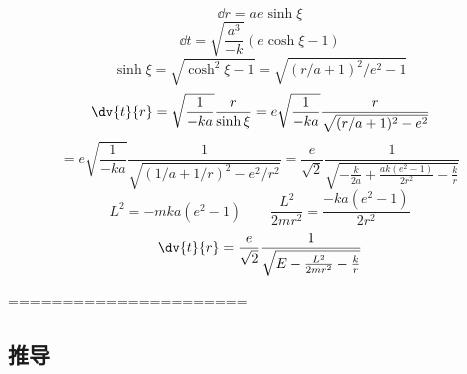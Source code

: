 \begin{equation}
\dd{r} = ae \sinh\xi
\end{equation}
\begin{equation}
\dd{t} = \sqrt{\frac{a^3}{-k}} (e \cosh \xi - 1)
\end{equation}
\begin{equation}
\sinh\xi = \sqrt{\cosh^2\xi - 1} = \sqrt{(r/a + 1)^2/e^2 - 1}
\end{equation}
\begin{equation}
\dv{t}{r} = \sqrt{\frac{1}{-ka}} \frac{r}{\sinh\xi} = e\sqrt{\frac{1}{-ka}} \frac{r}{\sqrt{(r/a + 1)^2 - e^2}}
\end{equation}
\begin{equation}
= e\sqrt{\frac{1}{-ka}} \frac{1}{\sqrt{(1/a + 1/r)^2 - e^2/r^2}}
= \frac{e}{\sqrt2}\frac{1}{\sqrt{-\frac{k}{2a} + \frac{ak(e^2-1)}{2r^2} - \frac{k}{r}}}
\end{equation}
\begin{equation}
L^2 = -mka(e^2-1)
\qquad
\frac{L^2}{2mr^2} = \frac{-ka(e^2-1)}{2r^2}
\end{equation}
\begin{equation}
\dv{t}{r} = \frac{e}{\sqrt2}\frac{1}{\sqrt{E - \frac{L^2}{2mr^2} - \frac{k}{r}}}
\end{equation}




======================



\subsection{推导}
